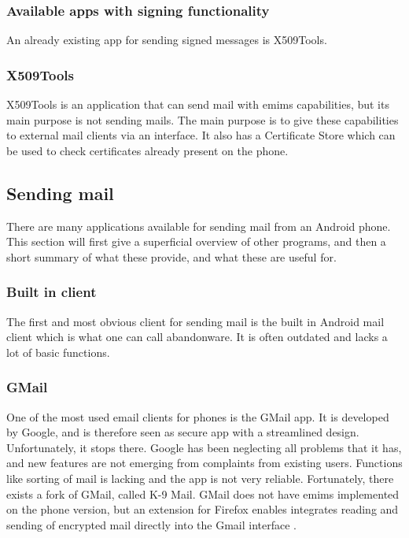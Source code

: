\subsubsection{Available apps with signing functionality}
An already existing app for sending signed messages is X509Tools.

\subsubsection{X509Tools}
X509Tools is an application that can send mail with \gls{emims} capabilities, but its main purpose is not sending mails. The main purpose is to give these capabilities to external mail clients via an interface. It also has a Certificate Store which can be used to check certificates already present on the phone. 

\subsection{Sending mail}
There are many applications available for sending mail from an Android phone. This section will first give a superficial overview of other programs, and then a short summary of what these provide, and what these are useful for.

\subsubsection{Built in client}
The first and most obvious client for sending mail is the built in Android mail client which is what one can call abandonware. It is often outdated and lacks a lot of basic functions.

\subsubsection{GMail}
One of the most used email clients for phones is the GMail app. It is developed by Google, and is therefore seen as secure app with a streamlined design. Unfortunately, it stops there. Google has been neglecting all problems that it has, and new features are not emerging from complaints from existing users. Functions like sorting of mail is lacking and the app is not very reliable. Fortunately, there exists a fork of GMail, called K-9 Mail. GMail does not have \gls{emims} implemented on the phone version, but an extension for Firefox enables integrates reading and sending of encrypted mail directly into the Gmail interface \cite{bib:gmail}.

